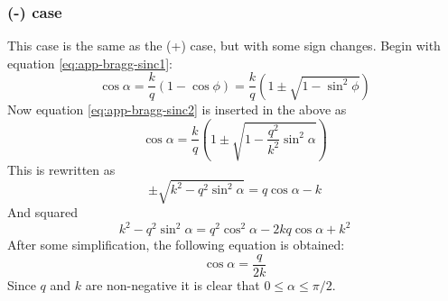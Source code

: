 \documentclass[11pt,twoside]{eitExjobb}
\begin{document}
	\subsubsection{(-) case}
	This case is the same as the (+) case, but with some sign changes. Begin with equation \eqref{eq:app-bragg-sinc1}:
	\begin{equation*}
		\cos{\alpha} = \frac{k}{q}\left( 1 - \cos{\phi} \right) = \frac{k}{q}\left( 1 \pm \sqrt{1-\sin^2{\phi}} \right)
	\end{equation*}
	Now equation \eqref{eq:app-bragg-sinc2} is inserted in the above as
	\begin{equation*}
		\cos{\alpha} = \frac{k}{q}\left( 1 \pm \sqrt{1-\frac{q^2}{k^2}\sin^2{\alpha}} \right)
	\end{equation*}
	This is rewritten as
	\begin{equation*}
		\pm \sqrt{k^2-q^2\sin^2{\alpha}} = q\cos{\alpha} - k
	\end{equation*}
	And squared
	\begin{equation*}
		k^2 - q^2\sin^2{\alpha} = q^2\cos^2{\alpha} - 2kq\cos{\alpha} + k^2
	\end{equation*}
	After some simplification, the following equation is obtained:
	\begin{equation}
		\cos{\alpha} = \frac{q}{2k} \label{eq:app-bragg-cos-}
	\end{equation}
	Since $q$ and $k$ are non-negative it is clear that $0 \leq \alpha \leq \pi/2$.
\end{document}

